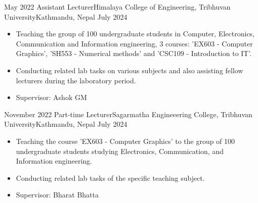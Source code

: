 \documentclass[localFont,alternative]{documentMETADATA}
\begin{document}
\begin{experiences}
	\experience
	{May 2022} {Assistant Lecturer}{Himalaya College of Engineering, Tribhuvan University}{Kathmandu, Nepal}
	{July 2024}    {\begin{itemize}
			\item Teaching the group of 100 undergraduate students in Computer, Electronics, Communication and Information engineering, 3 courses: ’EX603 - Computer Graphics’, ’SH553 - Numerical methods’ and ’CSC109 - Introduction to IT’.
			\item Conducting related lab tasks on various subjects and also assisting fellow lecturers during the laboratory period.
            \item Supervisor: Ashok GM
	\end{itemize}}
{}
\end{experiences}
\begin{experiences}
\experience
	{November 2022} {Part-time Lecturer}{Sagarmatha Engineeering College, Tribhuvan University}{Kathmandu, Nepal}
	{July 2024}    {\begin{itemize}
			\item Teaching the course 'EX603 - Computer Graphics' to the group of 100 undergraduate students studying Electronics, Communication, and Information engineering.
			\item Conducting related lab tasks of the specific teaching subject.
            \item Supervisor: Bharat Bhatta
	\end{itemize}}
{}
	
\end{experiences}

\\%
\end{document}
